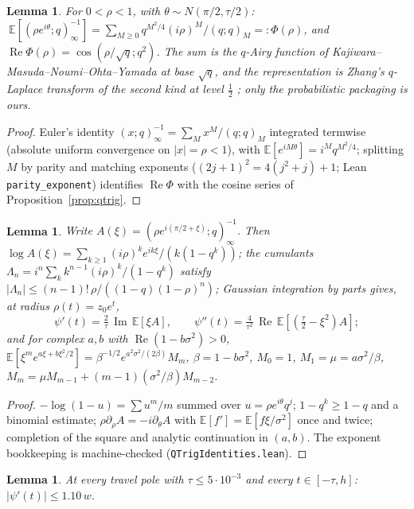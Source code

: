 \documentclass[11pt]{article}
\theoremstyle{plain}
\newtheorem{lemma}[theorem]{Lemma}
\theoremstyle{definition}
\theoremstyle{remark}
\begin{document}
\begin{lemma}\label{app:rep2}
For $0<\rho<1$, with $\theta\sim N(\pi/2,\tau/2)$:
$\ \mathbb{E}[(\rho e^{i\theta};q)_\infty^{-1}]=\sum_{M\ge0}q^{M^2/4}(i\rho)^M/(q;q)_M=:\Phi(\rho)$, and
$\operatorname{Re}\Phi(\rho)=\cos(\rho/\sqrt q;q^2)$. The sum is the $q$-Airy function of
Kajiwara--Masuda--Noumi--Ohta--Yamada \cite{KMNOY2004} at base $\sqrt q$, and the representation is Zhang's
$q$-Laplace transform of the second kind at level $\tfrac12$ \cite{Zhang2000}; only the
probabilistic packaging is ours.
\end{lemma}

\begin{proof}
Euler's identity $(x;q)_\infty^{-1}=\sum_Mx^M/(q;q)_M$ integrated termwise (absolute uniform
convergence on $|x|=\rho<1$), with $\mathbb{E}[e^{iM\theta}]=i^Mq^{M^2/4}$; splitting $M$ by parity and matching exponents
($(2j+1)^2=4(j^2+j)+1$; Lean \texttt{parity\_exponent}) identifies $\operatorname{Re}\Phi$ with the
cosine series of Proposition~\ref{prop:qtrig}.
\end{proof}

\begin{lemma}\label{app:cum}
Write $A(\xi)=(\rho e^{i(\pi/2+\xi)};q)_\infty^{-1}$. Then
$\log A(\xi)=\sum_{k\ge1}(i\rho)^ke^{ik\xi}/(k(1-q^k))$; the cumulants
$\Lambda_n=i^n\sum_kk^{n-1}(i\rho)^k/(1-q^k)$ satisfy
$|\Lambda_n|\le(n-1)!\,\rho/((1-q)(1-\rho)^n)$; Gaussian integration by parts gives, at radius
$\rho(t)=z_0e^{t}$,
\[
 \psi'(t)=\tfrac2\tau\,\operatorname{Im}\,\mathbb{E}[\xi A],\qquad
 \psi''(t)=\tfrac4{\tau^2}\,\operatorname{Re}\,\mathbb{E}[(\tfrac\tau2-\xi^2)A];
\]
and for complex $a,b$ with $\operatorname{Re}(1-b\sigma^2)>0$,
$\mathbb{E}[\xi^me^{a\xi+b\xi^2/2}]=\beta^{-1/2}e^{a^2\sigma^2/(2\beta)}M_m$, $\beta=1-b\sigma^2$,
$M_0=1$, $M_1=\mu=a\sigma^2/\beta$, $M_m=\mu M_{m-1}+(m-1)(\sigma^2/\beta)M_{m-2}$.
\end{lemma}

\begin{proof}
$-\log(1-u)=\sum u^m/m$ summed over $u=\rho e^{i\theta}q^j$; $1-q^k\ge1-q$ and a binomial estimate;
$\rho\partial_\rho A=-i\partial_\theta A$ with $\mathbb{E}[f']=\mathbb{E}[f\xi/\sigma^2]$ once and twice; completion of
the square and analytic continuation in $(a,b)$. The exponent bookkeeping is machine-checked
(\texttt{QTrigIdentities.lean}).
\end{proof}

\begin{lemma}\label{app:psi1}
At every travel pole with $\tau\le5\cdot10^{-3}$ and every $t\in[-\tau,h]$:
$|\psi'(t)|\le1.10\,w$.
\end{lemma}
\end{document}
